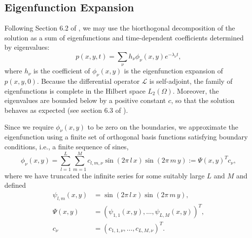 \documentclass[10pt]{article}
\begin{document}
\subsection{Eigenfunction Expansion} \label{sec:eigenfunction}
Following Section 6.2 of \cite{risken1989fokker-planck}, we may use
the biorthogonal decomposition of the solution as a sum of
eigenfunctions and time-dependent coefficients determined by eigenvalues:
\begin{equation}
  p(x,y,t) =  \sum_\nu h_\nu \phi_\nu (x, y) e^{-\lambda_\nu t}, \label{eq:biorthogonal}
\end{equation}
where $h_\nu$ is the coefficient of $\phi_\nu(x, y)$ is the
eigenfunction expansion of $p(x,y,0)$. Because the differential
operator $\mathcal{L}$ is self-adjoint, the family of eigenfunctions
is complete in the Hilbert space $L_2(\Omega)$. Moreover, the
eigenvalues are bounded below by a positive constant $c$, so that the
solution behaves as expected (see section 6.3 of
\cite{risken1989fokker-planck}).

Since we require $\phi_\nu(x,y)$ to be zero on the boundaries, we
approximate the eigenfunction using a finite set of orthogonal basis
functions satisfying boundary conditions, i.e., a finite sequence of
sines,
\[
  \phi_\nu(x,y) = \sum_{l=1}^L \sum_{m=1}^M c_{l,m, \nu}
  \sin\left(2\pi\, l\, x \right) \sin\left(2\pi\, m\, y \right) := \Psi(x,y)^T c_\nu,
\]
where we have truncated the infinite series for some suitably large
$L$ and $M$ and defined
\begin{align*}
  \psi_{l,m}(x,y) &= \sin\left(2\pi\, l\, x \right)
                         \sin\left(2\pi\, m\, y \right), \\
  \Psi(x,y) &= (\psi_{1,1}(x,y), \ldots, \psi_{L,M}(x,y))^T, \\
  c_\nu &= (c_{1,1,\nu}, \ldots, c_{L,M,\nu})^T.
\end{align*}
\end{document}

